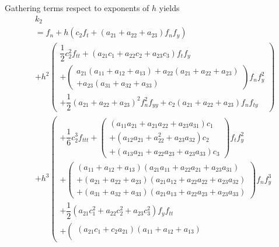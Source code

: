 \documentclass[a4paper,oneside]{book}
\numberwithin{equation}{chapter}
\begin{document}
Gathering terms respect to exponents of $h$ yields
\begin{align}
&{k_2}\\
& = {f_n} + h\left( {{c_2}{f_t} + \left( {{a_{21}} + {a_{22}} + {a_{23}}} \right){f_n}{f_y}} \right)\\
& + {h^2}\left( \begin{array}{l}
\dfrac{1}{2}c_2^2{f_{tt}} + \left( {{a_{21}}{c_1} + {a_{22}}{c_2} + {a_{23}}{c_3}} \right){f_t}{f_y}\\
 + \left( \begin{array}{l}
{a_{21}}\left( {{a_{11}} + {a_{12}} + {a_{13}}} \right) + {a_{22}}\left( {{a_{21}} + {a_{22}} + {a_{23}}} \right)\\
 + {a_{23}}\left( {{a_{31}} + {a_{32}} + {a_{33}}} \right)
\end{array} \right){f_n}f_y^2\\
 + \dfrac{1}{2}{\left( {{a_{21}} + {a_{22}} + {a_{23}}} \right)^2}f_n^2{f_{yy}} + {c_2}\left( {{a_{21}} + {a_{22}} + {a_{23}}} \right){f_n}{f_{ty}}
\end{array} \right)\\
& + {h^3}\left( \begin{array}{l}
 + \dfrac{1}{6}c_2^3{f_{ttt}} + \left( \begin{array}{l}
\left( {{a_{11}}{a_{21}} + {a_{21}}{a_{22}} + {a_{23}}{a_{31}}} \right){c_1}\\
 + \left( {{a_{12}}{a_{21}} + a_{22}^2 + {a_{23}}{a_{32}}} \right){c_2}\\
 + \left( {{a_{13}}{a_{21}} + {a_{22}}{a_{23}} + {a_{23}}{a_{33}}} \right){c_3}
\end{array} \right){f_t}f_y^2\\
 + \left( \begin{array}{l}
\left( {{a_{11}} + {a_{12}} + {a_{13}}} \right)\left( {{a_{21}}{a_{11}} + {a_{22}}{a_{21}} + {a_{23}}{a_{31}}} \right)\\
 + \left( {{a_{21}} + {a_{22}} + {a_{23}}} \right)\left( {{a_{21}}{a_{12}} + {a_{22}}{a_{22}} + {a_{23}}{a_{32}}} \right)\\
 + \left( {{a_{31}} + {a_{32}} + {a_{33}}} \right)\left( {{a_{21}}{a_{13}} + {a_{22}}{a_{23}} + {a_{23}}{a_{33}}} \right)
\end{array} \right){f_n}f_y^3\\
 + \dfrac{1}{2}\left( {{a_{21}}c_1^2 + {a_{22}}c_2^2 + {a_{23}}c_3^2} \right){f_y}{f_{tt}}\\
 + \left( \begin{array}{l}
\left( {{a_{21}}{c_1} + {c_2}{a_{21}}} \right)\left( {{a_{11}} + {a_{12}} + {a_{13}}} \right)\\

\end{array}
\end{array}
\end{align}
\end{document}

